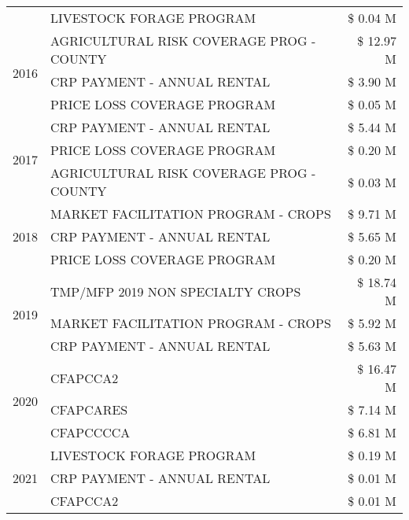 \begin{tabular}{llr}
 & LIVESTOCK FORAGE PROGRAM & \$ 0.04 M \\
\cline{1-3}
\multirow[t]{3}{*}{2016} & AGRICULTURAL RISK COVERAGE PROG - COUNTY & \$ 12.97 M \\
 & CRP PAYMENT - ANNUAL RENTAL & \$ 3.90 M \\
 & PRICE LOSS COVERAGE PROGRAM & \$ 0.05 M \\
\cline{1-3}
\multirow[t]{3}{*}{2017} & CRP PAYMENT - ANNUAL RENTAL & \$ 5.44 M \\
 & PRICE LOSS COVERAGE PROGRAM & \$ 0.20 M \\
 & AGRICULTURAL RISK COVERAGE PROG - COUNTY & \$ 0.03 M \\
\cline{1-3}
\multirow[t]{3}{*}{2018} & MARKET FACILITATION PROGRAM - CROPS & \$ 9.71 M \\
 & CRP PAYMENT - ANNUAL RENTAL & \$ 5.65 M \\
 & PRICE LOSS COVERAGE PROGRAM & \$ 0.20 M \\
\cline{1-3}
\multirow[t]{3}{*}{2019} & TMP/MFP 2019 NON SPECIALTY CROPS & \$ 18.74 M \\
 & MARKET FACILITATION PROGRAM - CROPS & \$ 5.92 M \\
 & CRP PAYMENT - ANNUAL RENTAL & \$ 5.63 M \\
\cline{1-3}
\multirow[t]{3}{*}{2020} & CFAPCCA2 & \$ 16.47 M \\
 & CFAPCARES & \$ 7.14 M \\
 & CFAPCCCCA & \$ 6.81 M \\
\cline{1-3}
\multirow[t]{3}{*}{2021} & LIVESTOCK FORAGE PROGRAM & \$ 0.19 M \\
 & CRP PAYMENT - ANNUAL RENTAL & \$ 0.01 M \\
 & CFAPCCA2 & \$ 0.01 M \\
\cline{1-3}
\bottomrule
\end{tabular}
